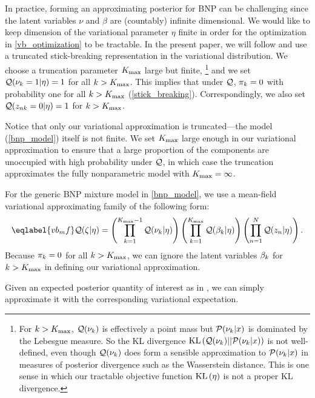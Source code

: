 In practice, forming an approximating posterior for BNP can be challenging since
the latent variables $\nu$ and $\beta$ are (countably) infinite dimensional. We
would like to keep dimension of the variational parameter $\eta$ finite in order
for the optimization in \eqref{vb_optimization} to be tractable. In the present
paper, we will follow \citet{blei:2006:vi_for_dp} and use a truncated
stick-breaking representation in the variational distribution. We choose a
truncation parameter ${K_{\mathrm{max}}}$ large but finite,
%
\footnote{For $k > {K_{\mathrm{max}}}$, $\mathcal{Q}(\nu_k)$ is effectively a point mass  but
$\mathcal{P}(\nu_k \vert x)$ is dominated by the Lebesgue measure.  So the KL
divergence $\mathrm{KL}\left(\mathcal{Q}(\nu_k) || \mathcal{P}(\nu_k \vert x)\right)$ is not well-defined, even
though $\mathcal{Q}(\nu_k)$ does form a sensible approximation to $\mathcal{P}(\nu_k \vert x)$
in measures of posterior divergence such as the Wasserstein distance.  This is
one sense in which our tractable objective function $\mathrm{KL}\left(\eta\right)$ is not a proper
KL divergence. }
%
and we set $\mathcal{Q}(\nu_k = 1 | \eta) =
1$ for all $k > {K_{\mathrm{max}}}$. This implies that under $\mathcal{Q}$, $\pi_k = 0$ with
probability one for all $k > {K_{\mathrm{max}}}$ (\eqref{stick_breaking}). Correspondingly,
we also set $\mathcal{Q}(z_{nk} = 0 | \eta) = 1$ for $k > {K_{\mathrm{max}}}$.

Notice that only our variational approximation is truncated---the model
(\eqref{bnp_model}) itself is not finite. We set ${K_{\mathrm{max}}}$ large enough in our
variational approximation to ensure that a large proportion of the components
are unoccupied with high probability under $\mathcal{Q}$, in which case the truncation
approximates the fully nonparametric model with ${K_{\mathrm{max}}} = \infty$.

For the generic BNP mixture model in \eqref{bnp_model}, we use a mean-field
variational approximating family of the following form:
%
\begin{align}\eqlabel{vb_mf}
%
\q(\zeta \vert \eta) =
    \left( \prod_{\k=1}^{\kmax - 1} \q(\nuk \vert \eta) \right)
    \left( \prod_{\k=1}^{\kmax} \q(\beta_\k \vert \eta) \right)
    \left( \prod_{\n=1}^{\N} \q(\z_{\n} \vert \eta) \right).
%
\end{align}
%
Because $\pi_k = 0$ for all $k > {K_{\mathrm{max}}}$, we can ignore the latent variables
$\beta_k$ for $k > {K_{\mathrm{max}}}$ in defining our variational approximation.

Given an expected posterior quantity of interest as in
, we can simply approximate it with the
corresponding variational expectation.

